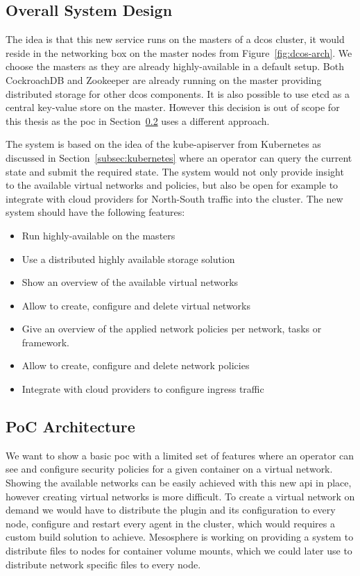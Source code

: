\subsection{Overall System Design}
\label{subsec:system-design}
The idea is that this new service runs on the masters of a \gls{dcos} cluster, it would reside in the networking box on the master nodes from Figure~\ref{fig:dcos-arch}. We choose the masters as they are already highly-available in a default setup. Both CockroachDB\cite{cockroachdb} and Zookeeper\cite{zookeeper} are already running on the master providing distributed storage for other \gls{dcos} components. It is also possible to use etcd\cite{etcd} as a central key-value store on the master. However this decision is out of scope for this thesis as the \gls{poc} in Section~\ref{subsec:poc-architecture} uses a different approach.

The system is based on the idea of the kube-apiserver from Kubernetes as discussed in Section~\ref{subsec:kubernetes} where an operator can query the current state and submit the required state. The system would not only provide insight to the available virtual networks and policies, but also be open for example to integrate with cloud providers for North-South traffic into the cluster. The new system should have the following features: 
\begin{itemize}
    \item Run highly-available on the masters
    \item Use a distributed highly available storage solution
    \item Show an overview of the available virtual networks
    \item Allow to create, configure and delete virtual networks
    \item Give an overview of the applied network policies per network, tasks or framework.
    \item Allow to create, configure and delete network policies
    \item Integrate with cloud providers to configure ingress traffic
\end{itemize}

\subsection{PoC Architecture}
\label{subsec:poc-architecture}
We want to show a basic \gls{poc} with a limited set of features where an operator can see and configure security policies for a given container on a virtual network. Showing the available networks can be easily achieved with this new \gls{api} in place, however creating virtual networks is more difficult. To create a virtual network on demand we would have to distribute the plugin and its configuration to every node, configure and restart every agent in the cluster, which would requires a custom build solution to achieve. Mesosphere is working on providing a system to distribute files to nodes for container volume mounts, which we could later use to distribute network specific files to every node.

